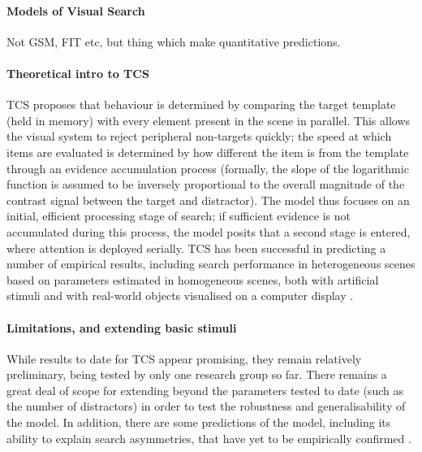 \documentclass[smallextended]{svjour3}       %
\begin{document}
\paragraph{Models of Visual Search} Not GSM, FIT etc, but thing which make quantitative predictions.

\paragraph{Theoretical intro to TCS}
TCS proposes that behaviour is determined by comparing the target template (held in memory) with every element present in the scene in parallel. This allows the visual system to reject peripheral non-targets quickly; the speed at which items are evaluated is determined by how different the item is from the template through an evidence accumulation process (formally, the slope of the logarithmic function is assumed to be inversely proportional to the overall magnitude of the contrast signal between the target and distractor). The model thus focuses on an initial, efficient processing stage of search; if sufficient evidence is not accumulated during this process, the model posits that a second stage is entered, where attention is deployed serially. TCS has been successful in predicting a number of empirical results, including search performance in heterogeneous scenes based on parameters estimated in homogeneous scenes, both with artificial stimuli \cite{buetti2016towards,lleras2019predicting} and with real-world objects visualised on a computer display \cite{wang2017predicting}. 
 
\paragraph{Limitations, and extending basic stimuli} While results to date for TCS appear promising, they remain relatively preliminary, being tested by only one research group so far. There remains a great deal of scope for extending beyond the parameters tested to date (such as the number of distractors) in order to test the robustness and generalisability of the model. In addition, there are some predictions of the model, including its ability to explain search asymmetries, that have yet to be empirically confirmed \cite{lleras2020target}.
\end{document}
